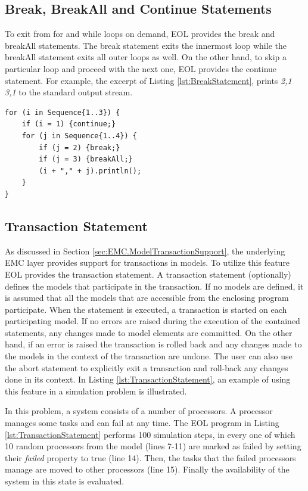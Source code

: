 \subsection{Break, BreakAll and Continue Statements}

To exit from for and while loops on demand, EOL provides the break and breakAll statements. The break statement exits the innermost loop while the breakAll statement exits all outer loops as well. On the other hand, to skip a particular loop and proceed with the next one, EOL provides the continue statement. For example, the excerpt of Listing \ref{lst:BreakStatement}, prints \textit{2,1 3,1} to the standard output stream.

\begin{lstlisting}[basicstyle=\ttfamily\footnotesize, flexiblecolumns=true, numbers=none, nolol=true, caption=Example of the break\, breakAll and continue statements, label=lst:BreakStatement, numbers=left, language=EOL, tabsize=2]
for (i in Sequence{1..3}) {
	if (i = 1) {continue;}
	for (j in Sequence{1..4}) {
		if (j = 2) {break;}
		if (j = 3) {breakAll;}
		(i + "," + j).println();
	}
}
\end{lstlisting}

\subsection{Transaction Statement}

As discussed in Section \ref{sec:EMC.ModelTransactionSupport}, the underlying EMC layer provides support for transactions in models. To utilize this feature EOL provides the transaction statement. A transaction statement (optionally) defines the models that participate in the transaction. If no models are defined, it is assumed that all the models that are accessible from the enclosing program participate. When the statement is executed, a transaction is started on each participating model. If no errors are raised during the execution of the contained statements, any changes made to model elements are committed. On the other hand, if an error is raised the transaction is rolled back and any changes made to the models in the context of the transaction are undone. The user can also use the abort statement to explicitly exit a transaction and roll-back any changes done in its context. In Listing \ref{lst:TransactionStatement}, an example of using this feature in a simulation problem is illustrated.

In this problem, a system consists of a number of processors. A processor manages some tasks and can fail at any time. The EOL program in Listing \ref{lst:TransactionStatement} performs 100 simulation steps, in every one of which 10 random processors from the model (lines 7-11) are marked as failed by setting their \emph{failed} property to true (line 14). Then, the tasks that the failed processors manage are moved to other processors (line 15). Finally the availability of the system in this state is evaluated.

